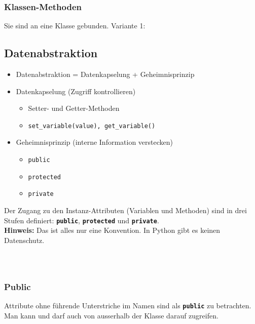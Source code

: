 \subsubsection{Klassen-Methoden}
Sie sind an eine Klasse gebunden.
Variante 1:



\begin{minipage}[t]{0.49\textwidth}
	\subsection{Datenabstraktion}
	\begin{itemize}
		\item Datenabstraktion = Datenkapselung + Geheimnisprinzip
		\item Datenkapselung (Zugriff kontrollieren)
		\begin{itemize}
			\item Setter- und Getter-Methoden
			\item[\-] \texttt{set\_variable(value), get\_variable()}
		\end{itemize}
		\item Geheimnisprinzip (interne Information verstecken)
		\begin{itemize}
			\item \texttt{public}
			\item \texttt{protected}
			\item \texttt{private}
		\end{itemize}
	\end{itemize}
	Der Zugang zu den Instanz-Attributen (Variablen und Methoden) sind in drei Stufen definiert: \textbf{\texttt{public}}, \textbf{\texttt{protected}} und \textbf{\texttt{private}}.\\
	\textbf{Hinweis:} Das ist alles nur eine Konvention. In Python gibt es keinen Datenschutz.
\end{minipage}
\begin{minipage}[t]{0.02\textwidth} $\quad$ \end{minipage}
\begin{minipage}[t]{0.49\textwidth}
	
\end{minipage}\\[12pt]


\begin{minipage}[t]{0.49\textwidth}
	\subsubsection{Public}
	Attribute ohne führende Unterstriche im Namen sind als \textbf{\texttt{public}} zu betrachten. Man kann und darf auch von ausserhalb der Klasse darauf zugreifen.
\end{minipage}
\begin{minipage}[t]{0.02\textwidth} $\quad$ \end{minipage}
\begin{minipage}[t]{0.49\textwidth}
	
\end{minipage}

